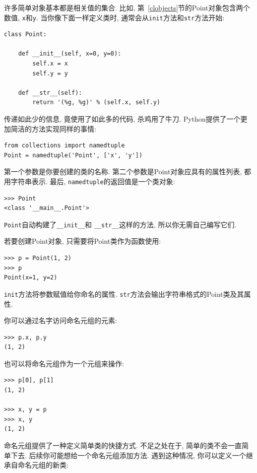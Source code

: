 \documentclass[10pt]{book}
\begin{document}
许多简单对象基本都是相关值的集合. 
比如, 第~\ref{clobjects}节的Point对象包含两个数值, {\tt x}和{\tt y}.
当你像下面一样定义类时, 通常会从{\tt init}方法和{\tt str}方法开始:

\begin{verbatim}
class Point:

    def __init__(self, x=0, y=0):
        self.x = x
        self.y = y

    def __str__(self):
        return '(%g, %g)' % (self.x, self.y)
\end{verbatim}

传递如此少的信息, 竟使用了如此多的代码, 杀鸡用了牛刀. 
Python提供了一个更加简洁的方法实现同样的事情:

\begin{verbatim}
from collections import namedtuple
Point = namedtuple('Point', ['x', 'y'])
\end{verbatim}

第一个参数是你要创建的类的名称. 
第二个参数是Point对象应具有的属性列表, 都用字符串表示. 
最后, {\tt namedtuple}的返回值是一个类对象:

\begin{verbatim}
>>> Point
<class '__main__.Point'>
\end{verbatim}

{\tt Point}自动构建了\verb"__init__"和
\verb"__str__"这样的方法, 所以你无需自己编写它们. 

若要创建Point对象, 只需要将Point类作为函数使用:

\begin{verbatim}
>>> p = Point(1, 2)
>>> p
Point(x=1, y=2)
\end{verbatim}

{\tt init}方法将参数赋值给你命名的属性. 
{\tt str}方法会输出字符串格式的Point类及其属性. 

你可以通过名字访问命名元组的元素:

\begin{verbatim}
>>> p.x, p.y
(1, 2)
\end{verbatim}

也可以将命名元组作为一个元组来操作:

\begin{verbatim}
>>> p[0], p[1]
(1, 2)

>>> x, y = p
>>> x, y
(1, 2)
\end{verbatim}

命名元组提供了一种定义简单类的快捷方式. 
不足之处在于, 简单的类不会一直简单下去. 
后续你可能想给一个命名元组添加方法. 
遇到这种情况, 你可以定义一个继承自命名元组的新类:
\end{document}
